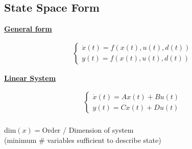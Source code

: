 \subsection{State Space Form}
    \begin{minipage}{0.49 \linewidth}
        \begin{center}
            \textbf{\underline{General form}}
        \end{center}
        \begin{align*}
            \begin{cases}
                \dot{x}(t) = f(x(t), u(t), d(t))\\
                y(t) = f(x(t), u(t), d(t))
            \end{cases}
        \end{align*}
    \end{minipage}
    \begin{minipage}{0.49 \linewidth}
        \begin{center}
            \textbf{\underline{Linear System}}
        \end{center}
        \begin{align*}
            \begin{cases}
                \dot{x}(t) = Ax(t) + Bu(t)\\
                y(t) = Cx(t) + Du(t)
            \end{cases}\\
        \end{align*}
    \end{minipage}
    dim$(x) = $Order / Dimension of system\\ 
    (minimum $\#$ variables sufficient to describe state)
    